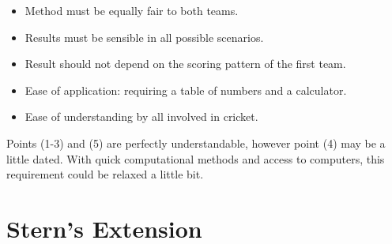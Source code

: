 \begin{itemize}
	\item Method must be equally fair to both teams.
	\vspace{0.02cm}
	\item Results must be sensible in all possible scenarios.
	\vspace{0.02cm}
	\item Result should not depend on the scoring pattern of the first team.
	\vspace{0.02cm}
	\item Ease of application: requiring a table of numbers and a calculator.
	\vspace{0.02cm}
	\item Ease of understanding by all involved in cricket.
\end{itemize}

Points (1-3) and (5) are perfectly understandable, however point (4) may be a little dated. With quick computational methods and access to computers, this requirement could be relaxed a little bit.


\section{Stern's Extension}